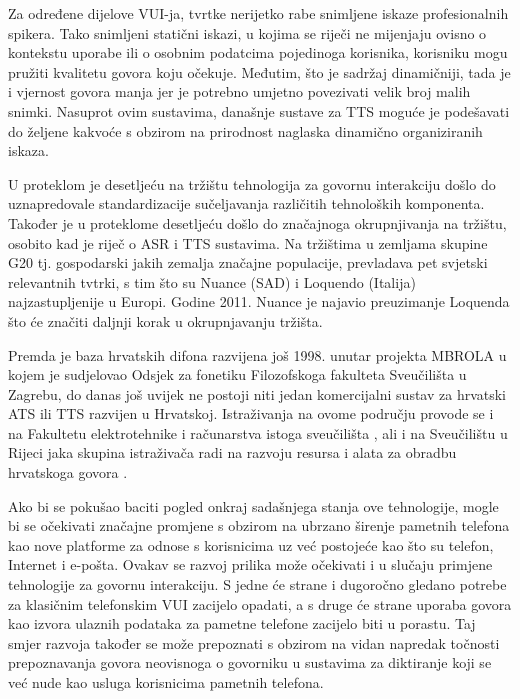 \begin{multicols}{2}

Za određene dijelove VUI-ja, tvrtke nerijetko rabe snimljene iskaze profesionalnih spikera. Tako snimljeni statični iskazi, u kojima se riječi ne mijenjaju ovisno o kontekstu uporabe ili o osobnim podatcima pojedinoga korisnika, korisniku mogu pružiti kvalitetu govora koju očekuje. Međutim, što je sadržaj dinamičniji, tada je i vjernost govora manja jer je potrebno umjetno povezivati velik broj malih snimki. Nasuprot ovim sustavima, današnje sustave za TTS moguće je podešavati do željene kakvoće s obzirom na prirodnost naglaska dinamično organiziranih iskaza.

U proteklom je desetljeću na tržištu tehnologija za govornu interakciju došlo do uznapredovale standardizacije sučeljavanja različitih tehnoloških komponenta. Također je u proteklome desetljeću došlo do značajnoga okrupnjivanja na tržištu, osobito kad je riječ o ASR i TTS sustavima. Na tržištima u zemljama skupine G20 tj. gospodarski jakih zemalja značajne populacije, prevladava pet svjetski relevantnih tvtrki, s tim što su Nuance (SAD) i Loquendo (Italija) najzastupljenije u Europi. Godine 2011. Nuance je najavio preuzimanje Loquenda što će značiti daljnji korak u okrupnjavanju tržišta.

Premda je baza hrvatskih difona razvijena još 1998. unutar projekta MBROLA \cite{str20} u kojem je sudjelovao Odsjek za fonetiku Filozofskoga fakulteta Sveučilišta u Zagrebu, do danas još uvijek ne postoji niti jedan komercijalni sustav za hrvatski ATS ili TTS razvijen u Hrvatskoj. Istraživanja na ovome području provode se i na Fakultetu elektrotehnike i računarstva istoga sveučilišta \cite{art1}, ali i na Sveučilištu u Rijeci jaka skupina istraživača radi na razvoju resursa i alata za obradbu hrvatskoga govora \cite{art2, str21, art3}.

Ako bi se pokušao baciti pogled onkraj sadašnjega stanja ove tehnologije, mogle bi se očekivati značajne promjene s obzirom na ubrzano širenje pametnih telefona kao nove platforme za odnose s korisnicima uz već postojeće kao što su telefon, Internet i e-pošta. Ovakav se razvoj prilika može očekivati i u slučaju primjene tehnologije za govornu interakciju. S jedne će strane i dugoročno gledano potrebe za klasičnim telefonskim VUI zacijelo opadati, a s druge će strane uporaba govora kao izvora ulaznih podataka za pametne telefone zacijelo biti u porastu. Taj smjer razvoja također se može prepoznati s obzirom na vidan napredak točnosti prepoznavanja govora neovisnoga o govorniku u sustavima za diktiranje koji se već nude kao usluga korisnicima pametnih telefona.


\end{multicols}
